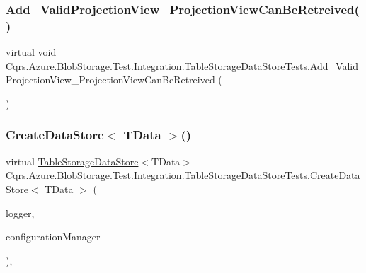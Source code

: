 \subsubsection{\texorpdfstring{Add\+\_\+\+Valid\+Projection\+View\+\_\+\+Projection\+View\+Can\+Be\+Retreived()}{Add\_ValidProjectionView\_ProjectionViewCanBeRetreived()}}
{\footnotesize\ttfamily virtual void Cqrs.\+Azure.\+Blob\+Storage.\+Test.\+Integration.\+Table\+Storage\+Data\+Store\+Tests.\+Add\+\_\+\+Valid\+Projection\+View\+\_\+\+Projection\+View\+Can\+Be\+Retreived (\begin{DoxyParamCaption}{ }\end{DoxyParamCaption})\hspace{0.3cm}{\ttfamily [virtual]}}

\mbox{\label{classCqrs_1_1Azure_1_1BlobStorage_1_1Test_1_1Integration_1_1TableStorageDataStoreTests_a76d6ef854f24e39f80de66e86cfa967c}} 
\subsubsection{\texorpdfstring{Create\+Data\+Store$<$ T\+Data $>$()}{CreateDataStore< TData >()}}
{\footnotesize\ttfamily virtual \hyperlink{classCqrs_1_1Azure_1_1BlobStorage_1_1DataStores_1_1TableStorageDataStore}{Table\+Storage\+Data\+Store}$<$T\+Data$>$ Cqrs.\+Azure.\+Blob\+Storage.\+Test.\+Integration.\+Table\+Storage\+Data\+Store\+Tests.\+Create\+Data\+Store$<$ T\+Data $>$ (\begin{DoxyParamCaption}\item[{I\+Logger}]{logger,  }\item[{\hyperlink{interfaceCqrs_1_1Configuration_1_1IConfigurationManager}{I\+Configuration\+Manager}}]{configuration\+Manager }\end{DoxyParamCaption})\hspace{0.3cm}{\ttfamily [protected]}, {\ttfamily [virtual]}}



